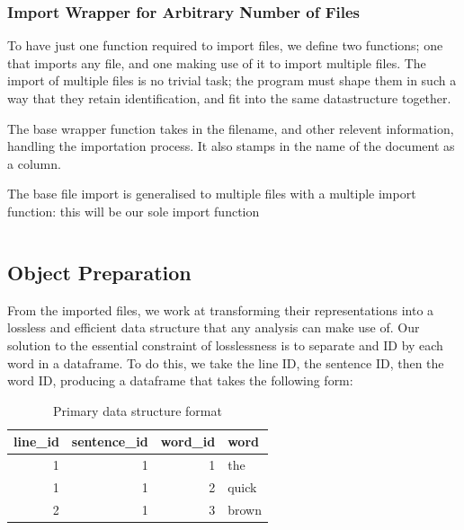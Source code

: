 \documentclass[11pt, a4paper, oneside]{report}
\begin{document}
\inputminted[frame=lines,fontsize=\scriptsize,xleftmargin=\parindent,linenos]{R}{R/import-excel.R}

\subsubsection{Import Wrapper for Arbitrary Number of Files}

To have just one function required to import files, we define two
functions; one that imports any file, and one making use of it to
import multiple files. The import of multiple files is no trivial
task; the program must shape them in such a way that they retain
identification, and fit into the same datastructure together.

The base wrapper function takes in the filename, and other relevent
information, handling the importation process. It also stamps in the
name of the document as a column.

The base file import is generalised to multiple files with a multiple
import function: this will be our sole import function

\inputminted[frame=lines,fontsize=\scriptsize,xleftmargin=\parindent,linenos]{R}{R/import-files.R}

\subsection{Object Preparation}

From the imported files, we work at transforming their representations
into a lossless and efficient data structure that any analysis can
make use of. Our solution to the essential constraint of losslessness
is to separate and ID by each word in a dataframe. To do this, we take
the line ID, the sentence ID, then the word ID, producing a dataframe
that takes the following form:

  \begin{table}[h]
    \centering
   
  \begin{tabular}{rrrl}
    line\_id & sentence\_id & word\_id & word\\
    \toprule
    1 & 1 & 1 & the\\
    1 & 1 & 2 & quick\\
    2 & 1 & 3 & brown\\
  \end{tabular}  
  \caption{Primary data structure format}\label{tab:data-base}
\end{table}
\end{document}
